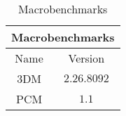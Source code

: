 \begin{table}[H]
    \centering
    \begin{tabular}{|| c | c ||}
    \hline
    \multicolumn{2}{||c||}{Macrobenchmarks} \\ [0.5ex] \hline\hline
    Name & Version \\\hline
    3DM & $2.26.8092$ \\
    PCM & $1.1$ \\\hline
    \end{tabular}
    \caption{Macrobenchmarks}
    \label{tab:macrobenchmarks}
\end{table}